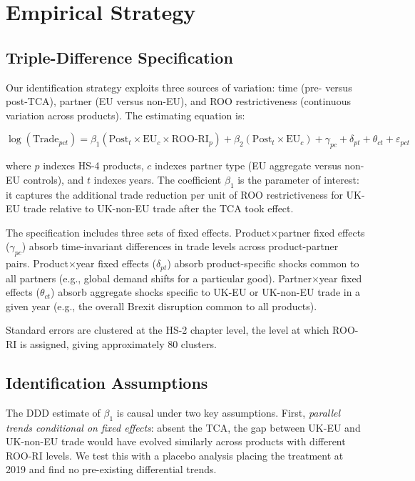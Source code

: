 \documentclass[12pt]{article}
\begin{document}
\section{Empirical Strategy}

\subsection{Triple-Difference Specification}

Our identification strategy exploits three sources of variation: time (pre- versus post-TCA), partner (EU versus non-EU), and ROO restrictiveness (continuous variation across products). The estimating equation is:

\begin{equation}
\log(\text{Trade}_{pct}) = \beta_1 (\text{Post}_t \times \text{EU}_c \times \text{ROO-RI}_p) + \beta_2 (\text{Post}_t \times \text{EU}_c) + \gamma_{pc} + \delta_{pt} + \theta_{ct} + \varepsilon_{pct}
\label{eq:ddd}
\end{equation}

\noindent where $p$ indexes HS-4 products, $c$ indexes partner type (EU aggregate versus non-EU controls), and $t$ indexes years. The coefficient $\beta_1$ is the parameter of interest: it captures the additional trade reduction per unit of ROO restrictiveness for UK-EU trade relative to UK-non-EU trade after the TCA took effect.

The specification includes three sets of fixed effects. Product$\times$partner fixed effects ($\gamma_{pc}$) absorb time-invariant differences in trade levels across product-partner pairs. Product$\times$year fixed effects ($\delta_{pt}$) absorb product-specific shocks common to all partners (e.g., global demand shifts for a particular good). Partner$\times$year fixed effects ($\theta_{ct}$) absorb aggregate shocks specific to UK-EU or UK-non-EU trade in a given year (e.g., the overall Brexit disruption common to all products).

Standard errors are clustered at the HS-2 chapter level, the level at which ROO-RI is assigned, giving approximately 80 clusters.

\subsection{Identification Assumptions}

The DDD estimate of $\beta_1$ is causal under two key assumptions. First, \textit{parallel trends conditional on fixed effects}: absent the TCA, the gap between UK-EU and UK-non-EU trade would have evolved similarly across products with different ROO-RI levels. We test this with a placebo analysis placing the treatment at 2019 and find no pre-existing differential trends.
\end{document}
